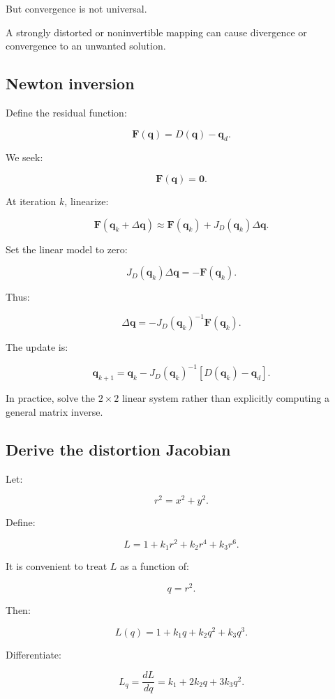 But convergence is not universal.

A strongly distorted or noninvertible mapping can cause divergence or convergence to an unwanted solution.

\subsection{Newton inversion}\label{02-foundations-ii-ch035-newton-inversion}

Define the residual function:

\[
 \boxed{ \mathbf F(\mathbf q)= D(\mathbf q)-\mathbf q_d }.
\]

We seek:

\[
 \mathbf F(\mathbf q)=\mathbf0.
\]

At iteration \(k\), linearize:

\[
 \mathbf F(\mathbf q_k+\Delta\mathbf q) \approx \mathbf F(\mathbf q_k)+J_D(\mathbf q_k)\Delta\mathbf q.
\]

Set the linear model to zero:

\[
 J_D(\mathbf q_k)\Delta\mathbf q = -\mathbf F(\mathbf q_k).
\]

Thus:

\[
 \boxed{ \Delta\mathbf q = -J_D(\mathbf q_k)^{-1} \mathbf F(\mathbf q_k) }.
\]

The update is:

\[
 \boxed{ \mathbf q_{k+1} = \mathbf q_k- J_D(\mathbf q_k)^{-1} [D(\mathbf q_k)-\mathbf q_d] }.
\]

In practice, solve the \(2\times2\) linear system rather than explicitly computing a general matrix inverse.

\subsection{Derive the distortion Jacobian}\label{02-foundations-ii-ch035-derive-the-distortion-jacobian}

Let:

\[
 r^2=x^2+y^2.
\]

Define:

\[
 L=1+k_1r^2+k_2r^4+k_3r^6.
\]

It is convenient to treat \(L\) as a function of:

\[
 q=r^2.
\]

Then:

\[
 L(q)=1+k_1q+k_2q^2+k_3q^3.
\]

Differentiate:

\[
 \boxed{ L_q=\frac{dL}{dq} = k_1+2k_2q+3k_3q^2 }.
\]

